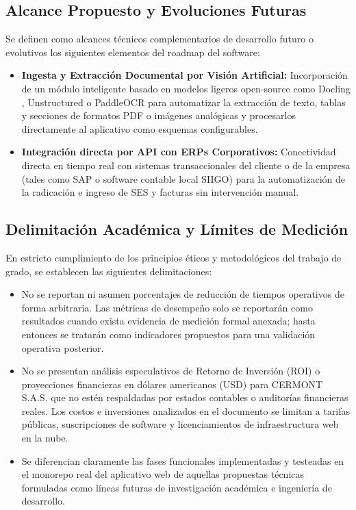 \subsection{Alcance Propuesto y Evoluciones Futuras}
Se definen como alcances técnicos complementarios de desarrollo futuro o evolutivos los siguientes elementos del roadmap del software:
\begin{itemize}
    \item \textbf{Ingesta y Extracción Documental por Visión Artificial:} Incorporación de un módulo inteligente basado en modelos ligeros open-source como Docling \cite{docling}, Unstructured \cite{unstructured} o PaddleOCR \cite{paddleocr} para automatizar la extracción de texto, tablas y secciones de formatos PDF o imágenes analógicas y procesarlos directamente al aplicativo como esquemas configurables.
    \item \textbf{Integración directa por API con ERPs Corporativos:} Conectividad directa en tiempo real con sistemas transaccionales del cliente o de la empresa (tales como SAP o software contable local SIIGO) para la automatización de la radicación e ingreso de SES y facturas sin intervención manual.
\end{itemize}

\subsection{Delimitación Académica y Límites de Medición}
En estricto cumplimiento de los principios éticos y metodológicos del trabajo de grado, se establecen las siguientes delimitaciones:
\begin{itemize}
    \item No se reportan ni asumen porcentajes de reducción de tiempos operativos de forma arbitraria. Las métricas de desempeño solo se reportarán como resultados cuando exista evidencia de medición formal anexada; hasta entonces se tratarán como indicadores propuestos para una validación operativa posterior.
    \item No se presentan análisis especulativos de Retorno de Inversión (ROI) o proyecciones financieras en dólares americanos (USD) para CERMONT S.A.S. que no estén respaldadas por estados contables o auditorías financieras reales. Los costos e inversiones analizados en el documento se limitan a tarifas públicas, suscripciones de software y licenciamientos de infraestructura web en la nube.
    \item Se diferencian claramente las fases funcionales implementadas y testeadas en el monorepo real del aplicativo web de aquellas propuestas técnicas formuladas como líneas futuras de investigación académica e ingeniería de desarrollo.
\end{itemize}

